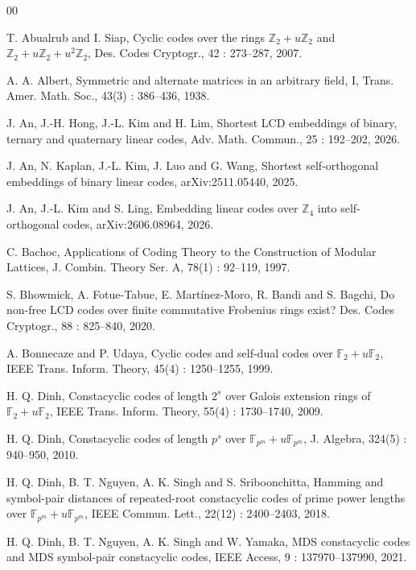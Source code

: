 \documentclass{article}
\theoremstyle{definition}
\theoremstyle{remark}
\begin{document}
\begin{thebibliography}{00}

 T. Abualrub and I. Siap, Cyclic codes over the rings $\mathbb{Z}_2+u\mathbb{Z}_2$ and $\mathbb{Z}_2+u\mathbb{Z}_2+u^2\mathbb{Z}_2$, Des. Codes Cryptogr., 42 : 273--287, 2007.

 A. A. Albert, Symmetric and alternate matrices in an arbitrary field, I, Trans. Amer. Math. Soc., 43(3) : 386--436, 1938.

 J. An, J.-H. Hong, J.-L. Kim and H. Lim, Shortest LCD embeddings of binary, ternary and quaternary linear codes, Adv. Math. Commun., 25 : 192--202, 2026.

 J. An, N. Kaplan, J.-L. Kim, J. Luo and G. Wang, Shortest self-orthogonal embeddings of binary linear codes, arXiv:2511.05440, 2025.

 J. An, J.-L. Kim and S. Ling, Embedding linear codes over $\mathbb{Z}_4$ into self-orthogonal codes, arXiv:2606.08964, 2026.

 C. Bachoc, Applications of Coding Theory to the Construction of Modular Lattices, J. Combin. Theory Ser. A, 78(1) : 92--119, 1997.

 S. Bhowmick, A. Fotue-Tabue, E. Mart\'inez-Moro, R. Bandi and S. Bagchi, Do non-free LCD codes over finite commutative Frobenius rings exist? Des. Codes Cryptogr., 88 : 825--840, 2020.

 A. Bonnecaze and P. Udaya, Cyclic codes and self-dual codes over $\mathbb{F}_2+u\mathbb{F}_2$, IEEE Trans. Inform. Theory, 45(4) : 1250--1255, 1999.

 H. Q. Dinh, Constacyclic codes of length $2^s$ over Galois extension rings of $\mathbb{F}_2+u\mathbb{F}_2$, IEEE Trans. Inform. Theory, 55(4) : 1730--1740, 2009.

 H. Q. Dinh, Constacyclic codes of length $p^s$ over $\mathbb{F}_{p^m}+u\mathbb{F}_{p^m}$, J. Algebra, 324(5) : 940--950, 2010.

 H. Q. Dinh, B. T. Nguyen, A. K. Singh and S. Sriboonchitta, Hamming and symbol-pair distances of repeated-root constacyclic codes of prime power lengths over $\mathbb{F}_{p^m}+ u\mathbb{F}_{p^m}$, IEEE Commun. Lett., 22(12) : 2400--2403, 2018.

 H. Q. Dinh, B. T. Nguyen, A. K. Singh and W. Yamaka, MDS constacyclic codes and MDS symbol-pair constacyclic codes, IEEE Access, 9 : 137970--137990, 2021.


\end{thebibliography}
\end{document}
